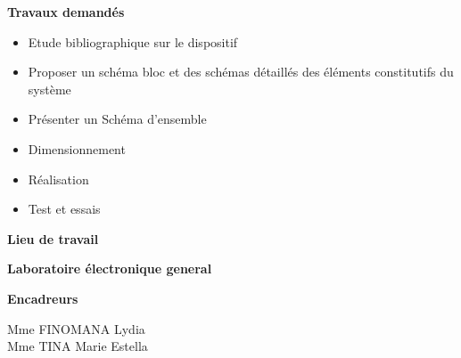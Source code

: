 \begin{center}
\hspace{-13cm}
\textbf{Travaux demandés} \\[5mm]

\begin{itemize}
  \item[\ding{118}] Etude bibliographique sur le dispositif \\ [5mm]
   \item[\ding{118}]Proposer un schéma bloc et des schémas détaillés des éléments constitutifs du
système \\[5mm]
    \item[\ding{118}]Présenter un Schéma d’ensemble \\[5mm]
    \item[\ding{118}]Dimensionnement\\[5mm]
     \item[\ding{118}] Réalisation\\[5mm]
     \item[\ding{118}] Test et essais \\[5mm]
\end{itemize}


\renewcommand*{\FrenchLabelItem}{$\bullet$} %

\hspace{-14cm}
\textbf{Lieu de travail}\\[5mm]
\begin{flushleft}
  \textbf{Laboratoire électronique general} \\ [5mm]
	
	 
\end{flushleft}

\hspace{-14.8cm}
\textbf{Encadreurs}\\[5mm]
\begin{flushleft}
	Mme FINOMANA Lydia \\[5mm]
	Mme TINA Marie Estella
\end{flushleft}



\end{center}





